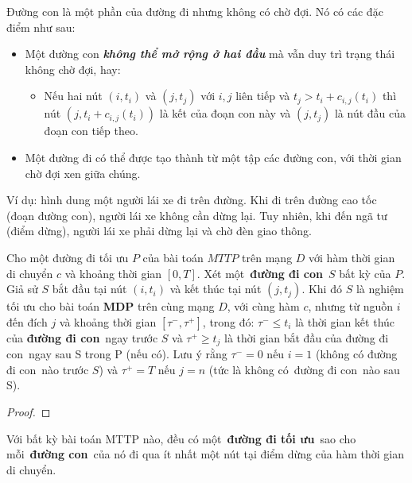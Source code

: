 \documentclass[../main.tex]{subfiles}
\begin{document}
Đường con là một phần của đường đi nhưng không có chờ đợi. Nó có các đặc
điểm như sau:

\begin{itemize}
\tightlist
\item
  Một đường con \textbf{\emph{không thể mở rộng ở hai đầu}} mà vẫn duy
  trì trạng thái không chờ đợi, hay:

  \begin{itemize}
  \tightlist
  \item
    Nếu hai nút \((i, t_i)\) và \((j, t_j)\) với \(i, j\) liên tiếp và
    \(t_j > t_i+c_{i,j}(t_i)\) thì nút \((j,t_i + c_{i,j}(t_i))\) là kết
    của đoạn con này và \((j, t_j)\) là nút đầu của đoạn con tiếp theo.
  \end{itemize}
\item
  Một đường đi có thể được tạo thành từ một tập các đường con, với thời
  gian chờ đợi xen giữa chúng.
\end{itemize}

Ví dụ: hình dung một người lái xe đi trên đường. Khi đi trên đường cao
tốc (đoạn đường con), người lái xe không cần dừng lại. Tuy nhiên, khi
đến ngã tư (điểm dừng), người lái xe phải dừng lại và chờ đèn giao
thông.

\begin{lemma}
\label{lem:toi-uu}
Cho một đường đi tối ưu
\(P\) của bài toán \(MTTP\) trên mạng \(D\) với hàm thời gian di chuyển
\(c\) và khoảng thời gian \([0,T]\). Xét một~\textbf{đường đi con}~\(S\)
bất kỳ của \(P\). Giả sử \(S\) bắt đầu tại nút \((i,t_i)\) và kết thúc
tại nút \((j,t_j)\). Khi đó \(S\) là nghiệm tối ưu cho bài toán
\textbf{MDP} trên cùng mạng \(D\), với cùng hàm \(c\), nhưng từ nguồn
\(i\) đến đích \(j\) và khoảng thời gian \([\tau^−,\tau^+]\), trong đó:
\(\tau^− \le t_i\) là thời gian kết thúc của \textbf{đường đi con}~ngay
trước \(S\) và \(\tau^+ \ge t_j\) là thời gian bắt đầu của đường đi
con~ngay sau S trong P (nếu có). Lưu ý rằng \(\tau^− = 0\) nếu \(i = 1\)
(không có đường đi con~nào trước \(S\)) và \(\tau^+ = T\) nếu \(j = n\)
(tức là không có~đường đi con~nào sau S).
\end{lemma}

\begin{proof}
\end{proof}

\begin{proposition}
\label{prp:mttp-toi-uu}
Với bất kỳ bài toán MTTP nào, đều có
một~\textbf{đường đi tối ưu}~sao cho mỗi~\textbf{đường con}~của nó đi
qua ít nhất một nút tại điểm dừng của hàm thời gian di chuyển.
\end{proposition}
\end{document}
